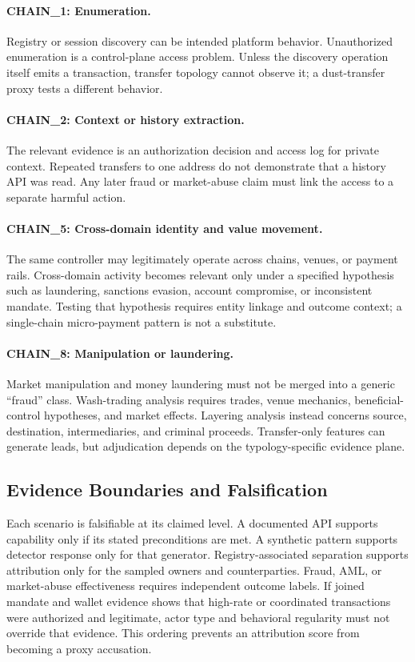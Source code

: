 \paragraph{CHAIN\_1: Enumeration.}
Registry or session discovery can be intended platform behavior.  Unauthorized
enumeration is a control-plane access problem.  Unless the discovery operation
itself emits a transaction, transfer topology cannot observe it; a dust-transfer
proxy tests a different behavior.

\paragraph{CHAIN\_2: Context or history extraction.}
The relevant evidence is an authorization decision and access log for private
context.  Repeated transfers to one address do not demonstrate that a history
API was read.  Any later fraud or market-abuse claim must link the access to a
separate harmful action.

\paragraph{CHAIN\_5: Cross-domain identity and value movement.}
The same controller may legitimately operate across chains, venues, or payment
rails.  Cross-domain activity becomes relevant only under a specified hypothesis
such as laundering, sanctions evasion, account compromise, or inconsistent
mandate.  Testing that hypothesis requires entity linkage and outcome context;
a single-chain micro-payment pattern is not a substitute.

\paragraph{CHAIN\_8: Manipulation or laundering.}
Market manipulation and money laundering must not be merged into a generic
``fraud'' class.  Wash-trading analysis requires trades, venue mechanics,
beneficial-control hypotheses, and market effects\cite{victor2021}.  Layering
analysis instead concerns source, destination, intermediaries, and criminal
proceeds.  Transfer-only features can generate leads, but adjudication depends
on the typology-specific evidence plane.

\subsection{Evidence Boundaries and Falsification}

Each scenario is falsifiable at its claimed level.  A documented API supports
capability only if its stated preconditions are met.  A synthetic pattern
supports detector response only for that generator.  Registry-associated
separation supports attribution only for the sampled owners and counterparties.
Fraud, AML, or market-abuse effectiveness requires independent outcome labels.
If joined mandate and wallet evidence shows that high-rate or coordinated
transactions were authorized and legitimate, actor type and behavioral
regularity must not override that evidence.  This ordering prevents an
attribution score from becoming a proxy accusation.
